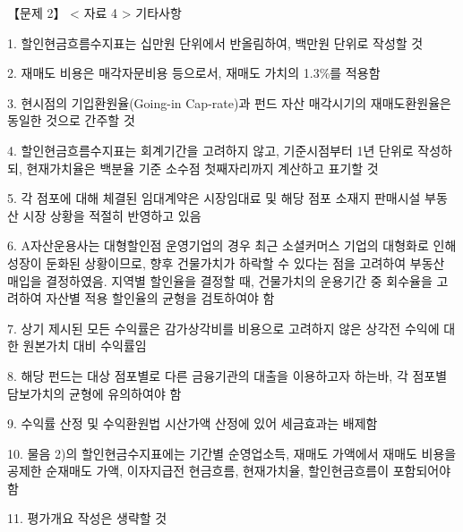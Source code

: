 \begin{longquestion}{【문제 2】}
< 자료 4 > 기타사항 \par
1. 할인현금흐름수지표는 십만원 단위에서 반올림하여, 백만원 단위로 작성할 것 \par
2. 재매도 비용은 매각자문비용 등으로서, 재매도 가치의 1.3\%를 적용함 \par
3. 현시점의 기입환원율(Going-in Cap-rate)과 펀드 자산 매각시기의 재매도환원율은 동일한 것으로 간주할 것 \par
4. 할인현금흐름수지표는 회계기간을 고려하지 않고, 기준시점부터 1년 단위로 작성하되, 현재가치율은 백분율 기준 소수점 첫째자리까지 계산하고 표기할 것 \par
5. 각 점포에 대해 체결된 임대계약은 시장임대료 및 해당 점포 소재지 판매시설 부동산 시장 상황을 적절히 반영하고 있음 \par
6. A자산운용사는 대형할인점 운영기업의 경우 최근 소셜커머스 기업의 대형화로 인해 성장이 둔화된 상황이므로, 향후 건물가치가 하락할 수 있다는 점을 고려하여 부동산 매입을 결정하였음. 지역별 할인율을 결정할 때, 건물가치의 운용기간 중 회수율을 고려하여 자산별 적용 할인율의 균형을 검토하여야 함 \par
7. 상기 제시된 모든 수익률은 감가상각비를 비용으로 고려하지 않은 상각전 수익에 대한 원본가치 대비 수익률임 \par
8. 해당 펀드는 대상 점포별로 다른 금융기관의 대출을 이용하고자 하는바, 각 점포별 담보가치의 균형에 유의하여야 함 \par
9. 수익률 산정 및 수익환원법 시산가액 산정에 있어 세금효과는 배제함 \par
10. 물음 2)의 할인현금수지표에는 기간별 순영업소득, 재매도 가액에서 재매도 비용을 공제한 순재매도 가액, 이자지급전 현금흐름, 현재가치율, 할인현금흐름이 포함되어야 함 \par
11. 평가개요 작성은 생략할 것 \par
\end{longquestion}
